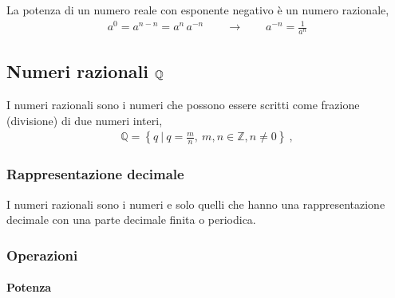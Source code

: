 \documentclass[letterpaper,10pt,italian]{jupyterBook}
\begin{document}
\sphinxAtStartPar
{} La potenza di un numero reale con esponente negativo è un numero razionale,
\begin{equation*}
\begin{split}a^0 = a^{n-n} = a^{n} \, a^{-n} \qquad \rightarrow \qquad a^{-n} = \frac{1}{a^n}\end{split}
\end{equation*}

\subsection{Numeri razionali \protect\(\mathbb{Q}\protect\)}
\label{\detokenize{ch/set/numeric-sets:numeri-razionali-mathbb-q}}\label{\detokenize{ch/set/numeric-sets:sets-numeric-q}}
\sphinxAtStartPar
I numeri razionali sono i numeri che possono essere scritti come frazione (divisione) di due numeri interi,
\begin{equation*}
\begin{split}\mathbb{Q} = \left\{ q \ \bigg| \ q = \frac{m}{n}, \ m, n \in \mathbb{Z}, n \ne 0 \right\} \ ,\end{split}
\end{equation*}

\subsubsection{Rappresentazione decimale}
\label{\detokenize{ch/set/numeric-sets:rappresentazione-decimale}}\label{\detokenize{ch/set/numeric-sets:sets-numeric-q-decimals}}
\sphinxAtStartPar
I numeri razionali sono i numeri e solo quelli che hanno una rappresentazione decimale con una parte decimale finita o periodica.

\sphinxAtStartPar
{} 


\subsubsection{Operazioni}
\label{\detokenize{ch/set/numeric-sets:operazioni}}\label{\detokenize{ch/set/numeric-sets:sets-numeric-q-operations}}

\paragraph{Potenza}
\label{\detokenize{ch/set/numeric-sets:id4}}
\sphinxAtStartPar
{}
\end{document}

